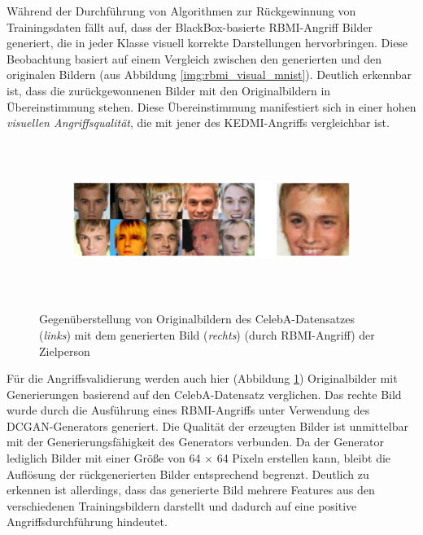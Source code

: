Während der Durchführung von Algorithmen zur Rückgewinnung von Trainingsdaten fällt auf, dass der BlackBox-basierte \glqq RBMI\grqq-Angriff Bilder generiert, die in jeder Klasse visuell korrekte Darstellungen hervorbringen. Diese Beobachtung basiert auf einem Vergleich zwischen den generierten und den originalen Bildern (aus Abbildung \ref{img:rbmi_visual_mnist}). Deutlich erkennbar ist, dass die zurückgewonnenen Bilder mit den Originalbildern in Übereinstimmung stehen. Diese Übereinstimmung manifestiert sich in einer hohen \textit{visuellen Angriffsqualität}, die mit jener des \glqq KEDMI\grqq-Angriffs vergleichbar ist.

\begin{figure}[H]
	\centering
	\begin{subfigure}[b]{0.8\linewidth}
		\includegraphics[width=\linewidth, height=5cm, keepaspectratio]{Bilder/0_celeba_rbmi.png}
	\end{subfigure}
	\caption{Gegenüberstellung von Originalbildern des CelebA-Datensatzes (\textit{links}) mit dem generierten Bild (\textit{rechts}) (durch \glqq RBMI\grqq-Angriff) der Zielperson}
	\label{img:rbmi_visual}
\end{figure}

Für die Angriffsvalidierung werden auch hier (Abbildung \ref{img:rbmi_visual}) Originalbilder mit Generierungen basierend auf den CelebA-Datensatz verglichen. Das rechte Bild wurde durch die Ausführung eines \glqq RBMI\grqq-Angriffs unter Verwendung des DCGAN-Generators generiert. Die Qualität der erzeugten Bilder ist unmittelbar mit der Generierungsfähigkeit des Generators verbunden. Da der Generator lediglich Bilder mit einer Größe von 64 $\times$ 64 Pixeln erstellen kann, bleibt die Auflösung der rückgenerierten Bilder entsprechend begrenzt. Deutlich zu erkennen ist allerdings, dass das generierte Bild mehrere Features aus den verschiedenen Trainingsbildern darstellt und dadurch auf eine positive Angriffsdurchführung hindeutet.

